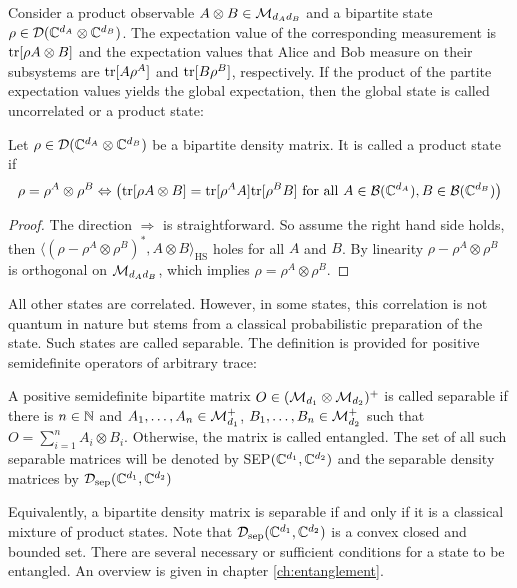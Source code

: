 Consider a product observable $A \otimes B \in \mathcal M_{d_Ad_B}$ and a bipartite state $\rho \in \mathcal D(\mathbb{C}^{d_A}\otimes \mathbb{C}^{d_B})$. The expectation value of the corresponding measurement is $\mathrm{tr}[\rho A \otimes B]$ and the expectation values that Alice and Bob measure on their subsystems are $\mathrm{tr}[A\rho^A]$ and $\mathrm{tr}[B\rho^B]$, respectively. If the product of the partite expectation values yields the global expectation, then the global state is called uncorrelated or a product state:
\begin{prop}
    Let $\rho \in \mathcal D(\mathbb{C}^{d_A}\otimes \mathbb{C}^{d_B})$ be a bipartite density matrix. It is called a product state if 
    \begin{align*}
        \rho = \rho^A \otimes \rho^B \Leftrightarrow \left(\mathrm{tr}[\rho A \otimes B] = \mathrm{tr}[\rho^A A ]\mathrm{tr}[\rho^B B] \text{ for all }A\in \mathcal B(\mathbb{C}^{d_A}),B\in \mathcal B(\mathbb{C}^{d_B})\right)
    \end{align*}{}
\end{prop}
\begin{proof}
    The direction $\Rightarrow$ is straightforward. So assume the right hand side holds, then $\langle (\rho -\rho^A \otimes \rho ^B)^*, A \otimes B\rangle_\text{HS}$ holes for all $A$ and $B$. By linearity $\rho -\rho^A \otimes \rho ^B$ is orthogonal on $\mathcal M_{d_Ad_B}$, which implies $\rho = \rho^A \otimes \rho^B$.
\end{proof}
All other states are correlated. However, in some states, this correlation is not quantum in nature but stems from a classical probabilistic preparation of the state. Such states are called separable. The definition is provided for positive semidefinite operators of arbitrary trace:
\begin{definition}
    A positive semidefinite bipartite matrix $O \in (\mathcal M_{d_1}\otimes \mathcal M_{d_2})^+$ is called separable if there is $n\in \mathbb{N}$ and $A_1, \dots, A_n \in \mathcal M_{d_1}^+$, $B_1, \dots, B_n \in \mathcal M_{d_2}^+$ such that $O = \sum_{i=1}^n A_i \otimes B_i$. Otherwise, the matrix is called entangled. The set of all such separable matrices will be denoted by SEP$(\mathbb{C}^{d_1},\mathbb{C}^{d_2})$ and the separable density matrices by $\mathcal D_\text{sep}(\mathbb{C}^{d_1},\mathbb{C}^{d_2})$
\end{definition}\noindent
Equivalently, a bipartite density matrix is separable if and only if it is a classical mixture of product states. Note that $\mathcal D_\text{sep}(\mathbb{C}^{d_1},\mathbb{C}^{d_2})$ is a convex closed and bounded set. There are several necessary or sufficient conditions for a state to be entangled. An overview is given in chapter \ref{ch:entanglement}. 

